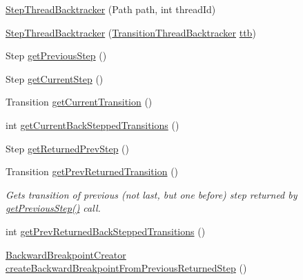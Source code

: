 \begin{DoxyCompactItemize}
\item 
\hyperlink{classgov_1_1nasa_1_1jpf_1_1inspector_1_1server_1_1pathanalysis_1_1_step_thread_backtracker_a26cb36680885eb7e4f09bb7d5cb52fd4}{Step\+Thread\+Backtracker} (Path path, int thread\+Id)
\item 
\hyperlink{classgov_1_1nasa_1_1jpf_1_1inspector_1_1server_1_1pathanalysis_1_1_step_thread_backtracker_af7bb5574f112c723525546395ae93796}{Step\+Thread\+Backtracker} (\hyperlink{classgov_1_1nasa_1_1jpf_1_1inspector_1_1server_1_1pathanalysis_1_1_transition_thread_backtracker}{Transition\+Thread\+Backtracker} \hyperlink{classgov_1_1nasa_1_1jpf_1_1inspector_1_1server_1_1pathanalysis_1_1_step_thread_backtracker_af8116b6e623266190a23e9eee2a48c59}{ttb})
\item 
Step \hyperlink{classgov_1_1nasa_1_1jpf_1_1inspector_1_1server_1_1pathanalysis_1_1_step_thread_backtracker_a95d37f588a7cc427ab15b5e049c13030}{get\+Previous\+Step} ()
\item 
Step \hyperlink{classgov_1_1nasa_1_1jpf_1_1inspector_1_1server_1_1pathanalysis_1_1_step_thread_backtracker_aec6482dc4d82b33bc11df2a5459acc0f}{get\+Current\+Step} ()
\item 
Transition \hyperlink{classgov_1_1nasa_1_1jpf_1_1inspector_1_1server_1_1pathanalysis_1_1_step_thread_backtracker_ade552298fe44fc560f0e92b2eb63415f}{get\+Current\+Transition} ()
\item 
int \hyperlink{classgov_1_1nasa_1_1jpf_1_1inspector_1_1server_1_1pathanalysis_1_1_step_thread_backtracker_a798848cdf02d69fedbbd7a4afa60ed8c}{get\+Current\+Back\+Stepped\+Transitions} ()
\item 
Step \hyperlink{classgov_1_1nasa_1_1jpf_1_1inspector_1_1server_1_1pathanalysis_1_1_step_thread_backtracker_a827662be15b9637859138355c3ec2ffd}{get\+Returned\+Prev\+Step} ()
\item 
Transition \hyperlink{classgov_1_1nasa_1_1jpf_1_1inspector_1_1server_1_1pathanalysis_1_1_step_thread_backtracker_a376a7486849375ffb01ad508d982c571}{get\+Prev\+Returned\+Transition} ()
\begin{DoxyCompactList}\small\item\em Gets transition of previous (not last, but one before) step returned by \hyperlink{classgov_1_1nasa_1_1jpf_1_1inspector_1_1server_1_1pathanalysis_1_1_step_thread_backtracker_a95d37f588a7cc427ab15b5e049c13030}{get\+Previous\+Step()} call. \end{DoxyCompactList}\item 
int \hyperlink{classgov_1_1nasa_1_1jpf_1_1inspector_1_1server_1_1pathanalysis_1_1_step_thread_backtracker_ad728f5203f48b54c13d4e340ed35158d}{get\+Prev\+Returned\+Back\+Stepped\+Transitions} ()
\item 
\hyperlink{classgov_1_1nasa_1_1jpf_1_1inspector_1_1server_1_1pathanalysis_1_1_backward_breakpoint_creator}{Backward\+Breakpoint\+Creator} \hyperlink{classgov_1_1nasa_1_1jpf_1_1inspector_1_1server_1_1pathanalysis_1_1_step_thread_backtracker_a4d64f68e2cd4354857594e6129889c1f}{create\+Backward\+Breakpoint\+From\+Previous\+Returned\+Step} ()
\end{DoxyCompactItemize}
